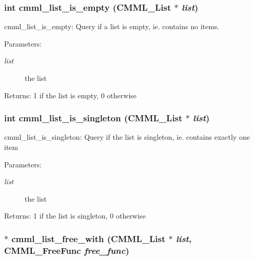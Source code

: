\subsubsection{\setlength{\rightskip}{0pt plus 5cm}int cmml\_\-list\_\-is\_\-empty ({\bf CMML\_\-List} $\ast$ {\em list})}\label{cmml_8h_a93}


cmml\_\-list\_\-is\_\-empty: Query if a list is empty, ie. contains no items.

\begin{Desc}
\item[Parameters:]
\begin{description}
\item[{\em list}]the list\end{description}
\end{Desc}
\begin{Desc}
\item[Returns:]1 if the list is empty, 0 otherwise \end{Desc}
\subsubsection{\setlength{\rightskip}{0pt plus 5cm}int cmml\_\-list\_\-is\_\-singleton ({\bf CMML\_\-List} $\ast$ {\em list})}\label{cmml_8h_a94}


cmml\_\-list\_\-is\_\-singleton: Query if the list is singleton, ie. contains exactly one item

\begin{Desc}
\item[Parameters:]
\begin{description}
\item[{\em list}]the list\end{description}
\end{Desc}
\begin{Desc}
\item[Returns:]1 if the list is singleton, 0 otherwise \end{Desc}
\subsubsection{$\ast$ cmml\_\-list\_\-free\_\-with ({\bf CMML\_\-List} $\ast$ {\em list}, {\bf CMML\_\-Free\-Func} {\em free\_\-func})}\label{cmml_8h_a95}


